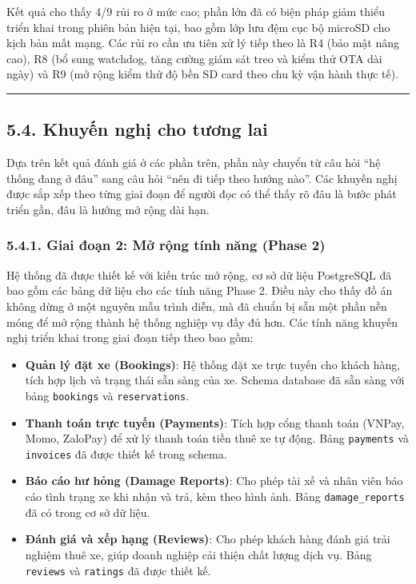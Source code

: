 \documentclass[a4paper]{extarticle}
\providecommand{\tightlist}{%
  \setlength{\itemsep}{0pt}\setlength{\parskip}{0pt}}
\begin{document}
Kết quả cho thấy 4/9 rủi ro ở mức cao; phần lớn đã có biện pháp giảm
thiểu triển khai trong phiên bản hiện tại, bao gồm lớp lưu đệm cục bộ
microSD cho kịch bản mất mạng. Các rủi ro cần ưu tiên xử lý tiếp theo là
R4 (bảo mật nâng cao), R8 (bổ sung watchdog, tăng cường giám sát treo và
kiểm thử OTA dài ngày) và R9 (mở rộng kiểm thử độ bền SD card theo chu
kỳ vận hành thực tế).

\begin{center}\rule{0.5\linewidth}{0.5pt}\end{center}

\subsection{5.4. Khuyến nghị cho tương
lai}\label{54-khuyux1ebfn-nghux1ecb-cho-tux1b0ux1a1ng-lai}

Dựa trên kết quả đánh giá ở các phần trên, phần này chuyển từ câu hỏi
``hệ thống đang ở đâu'' sang câu hỏi ``nên đi tiếp theo hướng nào''.
Các khuyến nghị được sắp xếp theo từng giai đoạn để người đọc có thể
thấy rõ đâu là bước phát triển gần, đâu là hướng mở rộng dài hạn.

\subsubsection{5.4.1. Giai đoạn 2: Mở rộng tính năng (Phase
2)}\label{541-giai-ux111oux1ea1n-2-mux1edf-rux1ed9ng-tuxednh-nux103ng-phase-2}

Hệ thống đã được thiết kế với kiến trúc mở rộng, cơ sở dữ liệu
PostgreSQL đã bao gồm các bảng dữ liệu cho các tính năng Phase 2. Điều
này cho thấy đồ án không dừng ở một nguyên mẫu trình diễn, mà đã chuẩn
bị sẵn một phần nền móng để mở rộng thành hệ thống nghiệp vụ đầy đủ hơn.
Các tính năng khuyến nghị triển khai trong giai đoạn tiếp theo bao gồm:

\begin{itemize}
\tightlist
\item
  \textbf{Quản lý đặt xe (Bookings)}: Hệ thống đặt xe trực tuyến cho
  khách hàng, tích hợp lịch và trạng thái sẵn sàng của xe. Schema
  database đã sẵn sàng với bảng \texttt{bookings} và
  \texttt{reservations}.
\item
  \textbf{Thanh toán trực tuyến (Payments)}: Tích hợp cổng thanh toán
  (VNPay, Momo, ZaloPay) để xử lý thanh toán tiền thuê xe tự động. Bảng
  \texttt{payments} và \texttt{invoices} đã được thiết kế trong schema.
\item
  \textbf{Báo cáo hư hỏng (Damage Reports)}: Cho phép tài xế và nhân
  viên báo cáo tình trạng xe khi nhận và trả, kèm theo hình ảnh. Bảng
  \texttt{damage\_reports} đã có trong cơ sở dữ liệu.
\item
  \textbf{Đánh giá và xếp hạng (Reviews)}: Cho phép khách hàng đánh giá
  trải nghiệm thuê xe, giúp doanh nghiệp cải thiện chất lượng dịch vụ.
  Bảng \texttt{reviews} và \texttt{ratings} đã được thiết kế.
\end{itemize}
\end{document}
